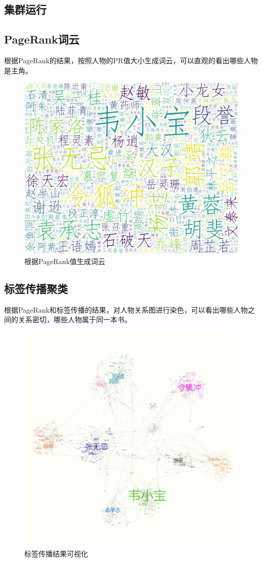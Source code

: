 \subsection{集群运行}
\subsection{PageRank词云}
根据PageRank的结果，按照人物的PR值大小生成词云，可以直观的看出哪些人物是主角。
		\begin{figure}[ht]
			\centering
			\includegraphics[scale=0.38]{figures/wordcloud.jpg}
			\caption{根据PageRank值生成词云}
		\end{figure}
\subsection{标签传播聚类}
根据PageRank和标签传播的结果，对人物关系图进行染色，可以看出哪些人物之间的关系密切，哪些人物属于同一本书。
\begin{figure}[ht]
	\centering
	\includegraphics[scale=0.45]{figures/label_prop.png}
	\caption{标签传播结果可视化}
\end{figure}